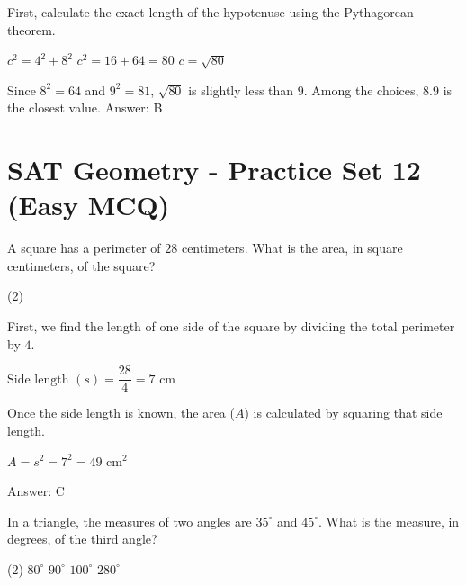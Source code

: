 \documentclass[11pt,paper=a4,answers]{exam}
\begin{document}
\begin{questions}
\begin{solution}
First, calculate the exact length of the hypotenuse using the Pythagorean theorem.
\vspace{5pt}
\begin{center}
$c^2 = 4^2 + 8^2$
\vspace{5pt}
$c^2 = 16 + 64 = 80$
\vspace{5pt}
$c = \sqrt{80}$
\end{center}
\vspace{5pt}
Since $8^2 = 64$ and $9^2 = 81$, $\sqrt{80}$ is slightly less than $9$. Among the choices, $8.9$ is the closest value.
\vspace{5pt}
Answer: \colorbox{yellow!100}{B}
\end{solution}


\section*{SAT Geometry - Practice Set 12 (Easy MCQ)}

\question
A square has a perimeter of $28$ centimeters. What is the area, in square centimeters, of the square?
\begin{tasks}(2)
\end{tasks}

\begin{solution}
First, we find the length of one side of the square by dividing the total perimeter by $4$.
\vspace{5pt}
\begin{center}
$\text{Side length } (s) = \dfrac{28}{4} = 7 \text{ cm}$
\end{center}
\vspace{5pt}
Once the side length is known, the area ($A$) is calculated by squaring that side length.
\vspace{5pt}
\begin{center}
$A = s^2 = 7^2 = 49 \text{ cm}^2$
\end{center}
\vspace{5pt}
Answer: \colorbox{yellow!100}{C}
\end{solution}

\vspace{1cm}

\question
In a triangle, the measures of two angles are $35^\circ$ and $45^\circ$. What is the measure, in degrees, of the third angle?
\begin{tasks}(2)
    \task $80^\circ$
    \task $90^\circ$
    \task $100^\circ$
    \task $280^\circ$
\end{tasks}


\end{questions}
\end{document}
